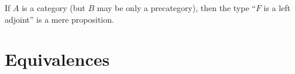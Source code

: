 \documentclass[hott-all.tex]{subfiles}
\begin{document}
\begin{lem}
  If $A$ is a category (but $B$ may be only a precategory), then the type ``$F$ is a left adjoint'' is a mere proposition.
\end{lem}
%



\section{Equivalences}

\end{document}
